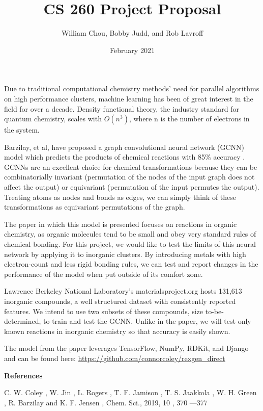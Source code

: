 \documentclass{article}
\title{CS 260 Project Proposal}
\author{William Chou, Bobby Judd, and Rob Lavroff }
\date{February 2021}
\begin{document}
\maketitle

Due to traditional computational chemistry methods' need for parallel algorithms on high performance clusters, machine learning has been of great interest in the field for over a decade. Density functional theory, the industry standard for quantum chemistry, scales with $O(n^3)$, where n is the number of electrons in the system.

Barzilay, et al, have proposed a graph convolutional neural network (GCNN) model which predicts the products of chemical reactions with 85\% accuracy \cite{C8SC04228D}. GCNNs are an excellent choice for chemical transformations because they can be combinatorially invariant (permutation of the nodes of the input graph does not affect the output) or equivariant (permutation of the input permutes the output). Treating atoms as nodes and bonds as edges, we can simply think of these transformations as equivariant permutations of the graph.

The paper in which this model is presented focuses on reactions in organic chemistry, as organic molecules tend to be small and obey very standard rules of chemical bonding. For this project, we would like to test the limits of this neural network by applying it to inorganic clusters. By introducing metals with high electron-count and less rigid bonding rules, we can test and report changes in the performance of the model when put outside of its comfort zone.

Lawrence Berkeley National Laboratory's materialsproject.org hosts 131,613 inorganic compounds, a well structured dataset with consistently reported features. We intend to use two subsets of these compounds, size to-be-determined, to train and test the GCNN. Unlike in the paper, we will test only known reactions in inorganic chemistry so that accuracy is easily shown.

The model from the paper leverages TensorFlow, NumPy, RDKit, and Django and can be found here: \url{https://github.com/connorcoley/rexgen_direct}

\medskip

\centering \textbf{References}

\medskip

C. W. Coley , W. Jin , L. Rogers , T. F. Jamison , T. S. Jaakkola , W. H. Green , R. Barzilay and K. F. Jensen , Chem. Sci., 2019, 10 , 370 —377
\end{document}

